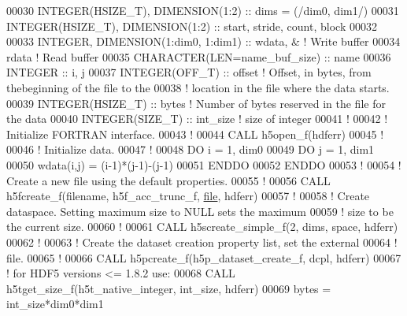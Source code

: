 \begin{DoxyCode}
00030   \textcolor{keywordtype}{INTEGER(HSIZE\_T)}, \textcolor{keywordtype}{DIMENSION(1:2)}   :: dims = (/dim0, dim1/)
00031   \textcolor{keywordtype}{INTEGER(HSIZE\_T)}, \textcolor{keywordtype}{DIMENSION(1:2)}   :: start, stride, count, block
00032 
00033   \textcolor{keywordtype}{INTEGER}, \textcolor{keywordtype}{DIMENSION(1:dim0, 1:dim1)} :: wdata, & \textcolor{comment}{! Write buffer }
00034                                         rdata    \textcolor{comment}{! Read buffer}
00035   \textcolor{keywordtype}{CHARACTER(LEN=name\_buf\_size)} :: name
00036   \textcolor{keywordtype}{INTEGER} :: i, j
00037   \textcolor{keywordtype}{INTEGER(OFF\_T)} :: offset \textcolor{comment}{! Offset, in bytes, from thebeginning of the file to the }
00038                            \textcolor{comment}{! location in the file where the data starts.}
00039   \textcolor{keywordtype}{INTEGER(HSIZE\_T)} :: bytes \textcolor{comment}{! Number of bytes reserved in the file for the data}
00040   \textcolor{keywordtype}{INTEGER(SIZE\_T)} :: int\_size \textcolor{comment}{! size of integer}
00041   \textcolor{comment}{!}
00042   \textcolor{comment}{! Initialize FORTRAN interface.}
00043   \textcolor{comment}{!}
00044   \textcolor{keyword}{CALL }h5open\_f(hdferr)
00045   \textcolor{comment}{!}
00046   \textcolor{comment}{! Initialize data.}
00047   \textcolor{comment}{!}
00048   \textcolor{keywordflow}{DO} i = 1, dim0
00049      \textcolor{keywordflow}{DO} j = 1, dim1
00050         wdata(i,j) = (i-1)*(j-1)-(j-1)
00051 \textcolor{keywordflow}{     ENDDO}
00052 \textcolor{keywordflow}{  ENDDO}
00053   \textcolor{comment}{!}
00054   \textcolor{comment}{! Create a new file using the default properties.}
00055   \textcolor{comment}{!}
00056   \textcolor{keyword}{CALL }h5fcreate\_f(filename, h5f\_acc\_trunc\_f, \hyperlink{structfile}{file}, hdferr)
00057   \textcolor{comment}{!}
00058   \textcolor{comment}{! Create dataspace.  Setting maximum size to NULL sets the maximum}
00059   \textcolor{comment}{! size to be the current size.}
00060   \textcolor{comment}{!}
00061   \textcolor{keyword}{CALL }h5screate\_simple\_f(2, dims, space, hdferr)
00062   \textcolor{comment}{!}
00063   \textcolor{comment}{! Create the dataset creation property list, set the external}
00064   \textcolor{comment}{! file.}
00065   \textcolor{comment}{!}
00066   \textcolor{keyword}{CALL }h5pcreate\_f(h5p\_dataset\_create\_f, dcpl, hdferr)
00067   \textcolor{comment}{! for HDF5 versions <= 1.8.2 use:}
00068   \textcolor{keyword}{CALL }h5tget\_size\_f(h5t\_native\_integer, int\_size, hdferr)
00069   bytes = int\_size*dim0*dim1

\end{DoxyCode}
